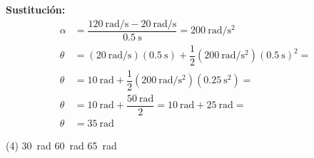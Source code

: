 \documentclass[12pt, letter]{exam}
\begin{document}
\begin{questions}
    \vspace*{0.3cm}
    \textbf{Sustitución:}
    \begin{align*}
    \alpha &= \dfrac{\displaystyle \SI[per-mode=fraction]{120}{\radian\per\second} - \SI[per-mode=fraction]{20}{\radian\per\second}}{\SI{0.5}{\second}} = \SI[per-mode=fraction]{200}{\radian\per\square\second} \\[0.5em]
    \theta &= \left(\SI[per-mode=fraction]{20}{\radian\per\second}\right)(\SI{0.5}{\second}) + \dfrac{1}{2} \left( \SI[per-mode=fraction]{200}{\radian\per\square\second} \right) \left( \SI{0.5}{\second} \right)^{2} = \\[0.5em]
    \theta &= \SI{10}{\radian} + \dfrac{1}{2} \left( \SI[per-mode=fraction]{200}{\radian\per\square\second} \right) \left( \SI{0.25}{\square\second} \right) = \\[0.5em]
    \theta &= \SI{10}{\radian} + \dfrac{\SI{50}{\radian}}{2} = \SI{10}{\radian} + \SI{25}{\radian} = \\[0.5em]
    \theta &= \SI{35}{\radian}
    \end{align*}
    \begin{tasks}(4)
        \task \SI{30}{\radian}
        \task {}
        \task \SI{60}{\radian}
        \task \SI{65}{\radian}
    \end{tasks}



\end{questions}
\end{document}

